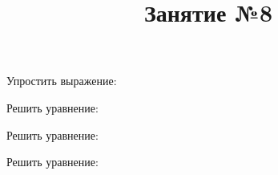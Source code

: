 \title{Занятие №8}
\begin{listofex}
	\item Упростить выражение:
	\begin{enumcols}[itemcolumns=1]
		\item {}
		\item {}
	\end{enumcols}
	\item Решить уравнение:
	\begin{enumcols}[itemcolumns=2]
		\item {}
		\item {}
	\end{enumcols}
	\item {}
	\item Решить уравнение:
	\begin{enumcols}[itemcolumns=2]
		\item {}
		\item {}
		\item {}
		\item {}
		\item {}
	\end{enumcols}
	\item Решить уравнение:
	\begin{enumcols}[itemcolumns=2]
		\item {}
		\item {}
	\end{enumcols}
\end{listofex}